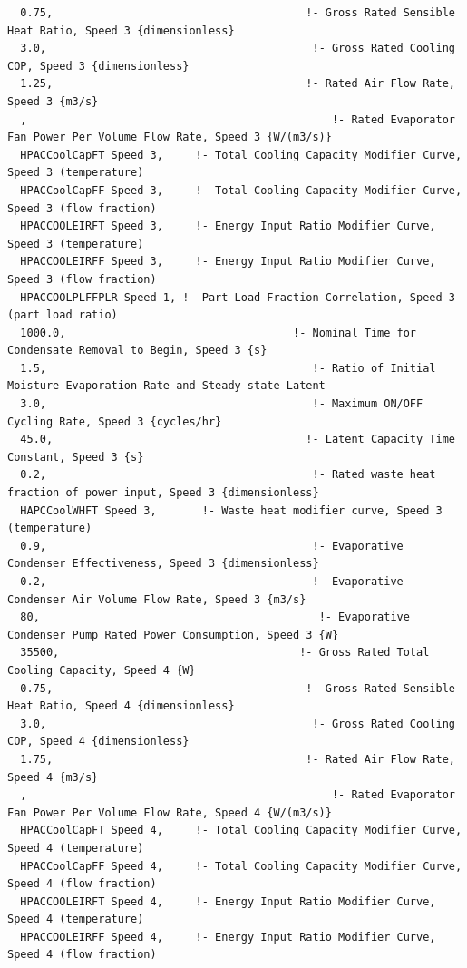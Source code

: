 \begin{lstlisting}
  0.75,                                       !- Gross Rated Sensible Heat Ratio, Speed 3 {dimensionless}
  3.0,                                         !- Gross Rated Cooling COP, Speed 3 {dimensionless}
  1.25,                                       !- Rated Air Flow Rate, Speed 3 {m3/s}
  ,                                               !- Rated Evaporator Fan Power Per Volume Flow Rate, Speed 3 {W/(m3/s)}
  HPACCoolCapFT Speed 3,     !- Total Cooling Capacity Modifier Curve, Speed 3 (temperature)
  HPACCoolCapFF Speed 3,     !- Total Cooling Capacity Modifier Curve, Speed 3 (flow fraction)
  HPACCOOLEIRFT Speed 3,     !- Energy Input Ratio Modifier Curve, Speed 3 (temperature)
  HPACCOOLEIRFF Speed 3,     !- Energy Input Ratio Modifier Curve, Speed 3 (flow fraction)
  HPACCOOLPLFFPLR Speed 1, !- Part Load Fraction Correlation, Speed 3 (part load ratio)
  1000.0,                                   !- Nominal Time for Condensate Removal to Begin, Speed 3 {s}
  1.5,                                         !- Ratio of Initial Moisture Evaporation Rate and Steady-state Latent
  3.0,                                         !- Maximum ON/OFF Cycling Rate, Speed 3 {cycles/hr}
  45.0,                                       !- Latent Capacity Time Constant, Speed 3 {s}
  0.2,                                         !- Rated waste heat fraction of power input, Speed 3 {dimensionless}
  HAPCCoolWHFT Speed 3,       !- Waste heat modifier curve, Speed 3 (temperature)
  0.9,                                         !- Evaporative Condenser Effectiveness, Speed 3 {dimensionless}
  0.2,                                         !- Evaporative Condenser Air Volume Flow Rate, Speed 3 {m3/s}
  80,                                           !- Evaporative Condenser Pump Rated Power Consumption, Speed 3 {W}
  35500,                                     !- Gross Rated Total Cooling Capacity, Speed 4 {W}
  0.75,                                       !- Gross Rated Sensible Heat Ratio, Speed 4 {dimensionless}
  3.0,                                         !- Gross Rated Cooling COP, Speed 4 {dimensionless}
  1.75,                                       !- Rated Air Flow Rate, Speed 4 {m3/s}
  ,                                               !- Rated Evaporator Fan Power Per Volume Flow Rate, Speed 4 {W/(m3/s)}
  HPACCoolCapFT Speed 4,     !- Total Cooling Capacity Modifier Curve, Speed 4 (temperature)
  HPACCoolCapFF Speed 4,     !- Total Cooling Capacity Modifier Curve, Speed 4 (flow fraction)
  HPACCOOLEIRFT Speed 4,     !- Energy Input Ratio Modifier Curve, Speed 4 (temperature)
  HPACCOOLEIRFF Speed 4,     !- Energy Input Ratio Modifier Curve, Speed 4 (flow fraction)

\end{lstlisting}
